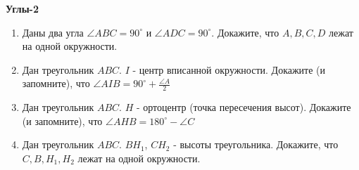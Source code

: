 \documentclass{article}
\begin{document}
\begin{center}
	\textbf{Углы-2}
\end{center}

\begin{enumerate}[label*=\protect\fbox{\arabic{enumi}}]
	
	\item Даны два угла $\angle ABC = 90^\circ$ и $\angle ADC = 90^\circ$. Докажите, что $A, B, C, D$ лежат на одной окружности.
	
	\item Дан треугольник $ABC$. $I$ - центр вписанной окружности. Докажите (и запомните), что $\angle AIB = 90^\circ + \frac{\angle A}{2}$
	
	\item Дан треугольник $ABC$. $H$ - ортоцентр (точка пересечения высот). Докажите (и запомните), что $\angle AHB = 180^\circ - \angle C$
	
	\item Дан треугольник $ABC$. $BH_1$, $CH_2$ - высоты треугольника. Докажите, что $C,B,H_1, H_2$ лежат на одной окружности.
	
\end{enumerate}
\end{document}
